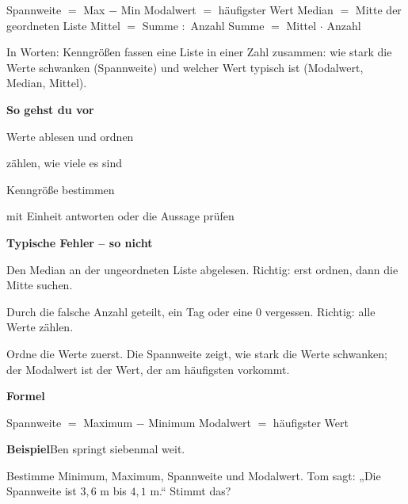 \documentclass[11pt]{article}
\newcommand{\nr}[1]{\makebox[7mm][l]{\textbf{#1}}}
\begin{document}
\begin{tcolorbox}[colback=mbkasten,colframe=mbgrau,boxrule=0.5pt,arc=1mm,left=3mm,right=3mm,top=2mm,bottom=2mm,title={\bfseries Formel auf einen Blick},coltitle=black,colbacktitle=black!10]
{\Large Spannweite $=$ Max $-$ Min \qquad Modalwert $=$ häufigster Wert \newline Median $=$ Mitte der geordneten Liste \newline Mittel $=$ Summe $:$ Anzahl \qquad Summe $=$ Mittel $\cdot$ Anzahl}\par\medskip
In Worten: Kenngrößen fassen eine Liste in einer Zahl zusammen: wie stark die Werte schwanken (Spannweite) und welcher Wert typisch ist (Modalwert, Median, Mittel).\par\medskip
\textbf{So gehst du vor}\par
\nr{1}Werte ablesen und ordnen\par
\nr{2}zählen, wie viele es sind\par
\nr{3}Kenngröße bestimmen\par
\nr{4}mit Einheit antworten oder die Aussage prüfen\par
\medskip
\end{tcolorbox}
\medskip\noindent\textbf{Typische Fehler – so nicht}\par\smallskip
\noindent\nr{$\times$}Den Median an der ungeordneten Liste abgelesen. Richtig: erst ordnen, dann die Mitte suchen.\par
\noindent\nr{$\times$}Durch die falsche Anzahl geteilt, ein Tag oder eine $0$ vergessen. Richtig: alle Werte zählen.\par
\clearpage\label{s:A}\noindent\colorbox{black!12}{}\hspace{3mm}{\Large\bfseries Spannweite und Modalwert}\par\smallskip
\noindent Ordne die Werte zuerst. Die Spannweite zeigt, wie stark die Werte schwanken; der Modalwert ist der Wert, der am häufigsten vorkommt.\par\medskip
\noindent\textbf{Formel}\par\nopagebreak\noindent\hspace*{4mm}\begin{minipage}{\dimexpr\linewidth-4mm\relax}Spannweite $=$ Maximum $-$ Minimum \qquad Modalwert $=$ häufigster Wert\end{minipage}\par\medskip
\noindent\textbf{Beispiel}\quad Ben springt siebenmal weit.\par\vspace{3pt} \par\vspace{3pt} Bestimme Minimum, Maximum, Spannweite und Modalwert. Tom sagt: „Die Spannweite ist $3{,}6$ m bis $4{,}1$ m.“ Stimmt das?\par\smallskip
\end{document}
